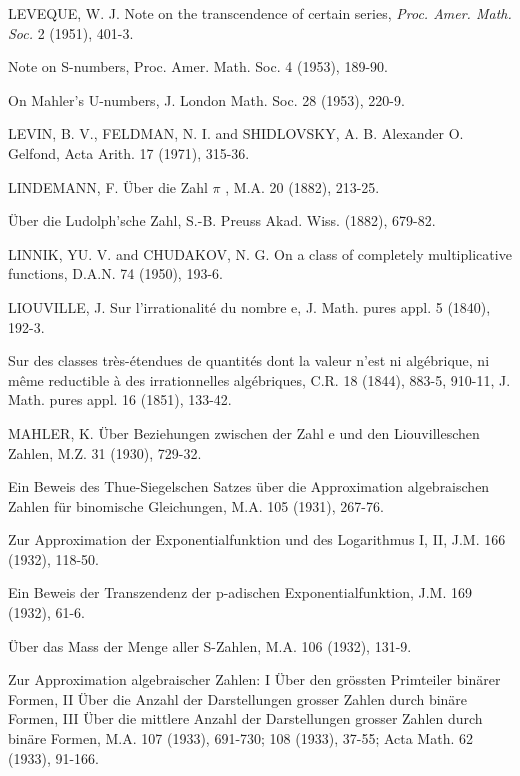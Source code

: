 \begin{hanglist}
    \item LEVEQUE, W. J. Note on the transcendence of certain series, \textit{Proc. Amer. Math. Soc.} 2 (1951), 401-3.
    \item \hspace{1.5em} Note on S-numbers, Proc. Amer. Math. Soc. 4 (1953), 189-90.
    \item \hspace{1.5em} On Mahler's U-numbers, J. London Math. Soc. 28 (1953), 220-9.
    \item LEVIN, B. V., FELDMAN, N. I. and SHIDLOVSKY, A. B. Alexander O. Gelfond, Acta Arith. 17 (1971), 315-36.
    \item LINDEMANN, F. Über die Zahl  $\pi$ , M.A. 20 (1882), 213-25.
    \item \hspace{1.5em} Über die Ludolph'sche Zahl, S.-B. Preuss Akad. Wiss. (1882), 679-82.
    \item LINNIK, YU. V. and CHUDAKOV, N. G. On a class of completely multiplicative functions, D.A.N. 74 (1950), 193-6.
    \item LIOUVILLE, J. Sur l'irrationalité du nombre e, J. Math. pures appl. 5 (1840), 192-3.
    \item \hspace{1.5em} Sur des classes très-étendues de quantités dont la valeur n'est ni algébrique, ni même reductible à des irrationnelles algébriques, C.R. 18 (1844), 883-5, 910-11, J. Math. pures appl. 16 (1851), 133-42.
    \item MAHLER, K. Über Beziehungen zwischen der Zahl e und den Liouvilleschen Zahlen, M.Z. 31 (1930), 729-32.
    \item \hspace{1.5em} Ein Beweis des Thue-Siegelschen Satzes über die Approximation algebraischen Zahlen für binomische Gleichungen, M.A. 105 (1931), 267-76.
    \item Zur Approximation der Exponentialfunktion und des Logarithmus I, II, J.M. 166 (1932), 118-50.
    \item Ein Beweis der Transzendenz der p-adischen Exponentialfunktion, J.M. 169 (1932), 61-6.
    \item Über das Mass der Menge aller S-Zahlen, M.A. 106 (1932), 131-9.
    \item Zur Approximation algebraischer Zahlen: I Über den grössten Primteiler binärer Formen, II Über die Anzahl der Darstellungen grosser Zahlen durch binäre Formen, III Über die mittlere Anzahl der Darstellungen grosser Zahlen durch binäre Formen, M.A. 107 (1933), 691-730; 108 (1933), 37-55; Acta Math. 62 (1933), 91-166.

\end{hanglist}
